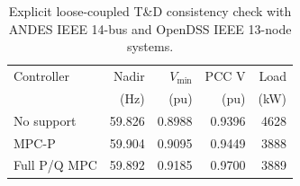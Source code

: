 \begin{table}[!t]
\centering
\footnotesize
\setlength{\tabcolsep}{3.5pt}
\caption{Explicit loose-coupled T\&D consistency check with ANDES IEEE 14-bus and OpenDSS IEEE 13-node systems.}
\label{tab:td_cosim}
\begin{tabular}{lrrrr}
\toprule
Controller & Nadir & $V_{\min}$ & PCC V & Load \\
 & (Hz) & (pu) & (pu) & (kW) \\
\midrule
No support & 59.826 & 0.8988 & 0.9396 & 4628 \\
MPC-P & 59.904 & 0.9095 & 0.9449 & 3888 \\
Full P/Q MPC & 59.892 & 0.9185 & 0.9700 & 3889 \\
\bottomrule
\end{tabular}
\end{table}
